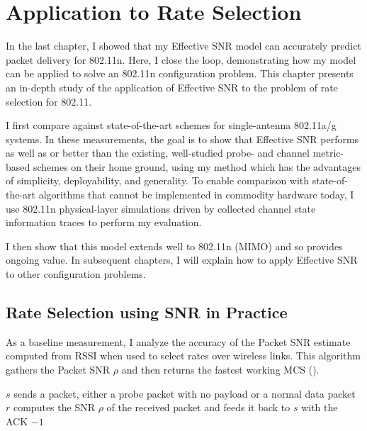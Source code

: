 \ifx\mainfile\undefined

\setcounter{chapter}{6} %
\fi

\cleardoublepage
\chapter{Application to Rate Selection}
\label{chap:rate}

In the last chapter, I showed that my Effective SNR model can accurately predict packet delivery for 802.11n. Here, I close the loop, demonstrating how my model can be applied to solve an 802.11n configuration problem. This chapter presents an in-depth study of the application of Effective SNR to the problem of rate selection for 802.11.

I first compare against state-of-the-art schemes for single-antenna 802.11a/g systems. In these measurements, the goal is to show that Effective SNR performs as well as or better than the existing, well-studied probe- and channel metric-based schemes on their home ground, using my method which has the advantages of simplicity, deployability, and generality. To enable comparison with state-of-the-art algorithms that cannot be implemented in commodity hardware today, I use 802.11n physical-layer simulations driven by collected channel state information traces to perform my evaluation.

I then show that this model extends well to 802.11n (MIMO) and so provides ongoing value. In subsequent chapters, I will explain how to apply Effective SNR to other configuration problems.

\section{Rate Selection using SNR in Practice}
As a baseline measurement, I analyze the accuracy of the Packet SNR estimate computed from RSSI when used to select rates over wireless links. This algorithm gathers the Packet SNR $\rho$ and then returns the fastest working MCS ().

\begin{algorithm}[t]
\caption{\label{alg:rate_select_snr}}
\begin{algorithmic}
\STATE $s$ sends a packet, either a probe packet with no payload or a normal data packet
\STATE $r$ computes the SNR $\rho$ of the received packet and feeds it back to $s$ with the ACK
\RETURN $-1$ \hfill {}
\ELSE
{} \hfill {}
\ENDIF
\end{algorithmic}
\end{algorithm}

